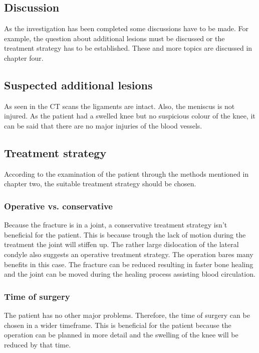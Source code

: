 \documentclass[a4paper]{article}
\begin{document}
\begin{multicols*}{2}
		\section{Discussion}
			As the investigation has been completed some discussions have to be made. For example,
			the question about additional lesions must be discussed or the treatment strategy has
			to be established. These and more topics are discussed in chapter four.
			
			\subsection{Suspected additional lesions}
				As seen in the CT scans the ligaments are intact. Also, the meniscus is not injured.
				As the patient had a swelled knee but no suspicious colour of the knee, it can be said
				that there are no major injuries of the blood vessels.
				
			\subsection{Treatment strategy}
				According to the examination of the patient through the methods mentioned in chapter
				two, the suitable treatment strategy should be chosen.
			
				\subsubsection{Operative vs. conservative}
					Because the fracture is in a joint, a conservative treatment strategy isn’t beneficial
					for the patient. This is because trough the lack of motion during the treatment the joint
					will stiffen up. The rather large dislocation of the lateral condyle also suggests an
					operative treatment strategy. The operation bares many benefits in this case. The fracture
					can be reduced resulting in faster bone healing and the joint can be moved during the
					healing process assisting blood circulation.
					
				\subsubsection{Time of surgery}
					The patient has no other major problems. Therefore, the time of surgery can be chosen
					in a wider timeframe. This is beneficial for the patient because the operation can be
					planned in more detail and the swelling of the knee will be reduced by that time. 
					

\end{multicols*}
\end{document}
